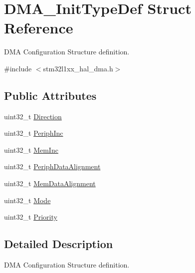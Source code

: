 \hypertarget{struct_d_m_a___init_type_def}{\section{D\-M\-A\-\_\-\-Init\-Type\-Def Struct Reference}
\label{struct_d_m_a___init_type_def}
}


D\-M\-A Configuration Structure definition.  




{\ttfamily \#include $<$stm32l1xx\-\_\-hal\-\_\-dma.\-h$>$}

\subsection*{Public Attributes}
\begin{DoxyCompactItemize}
\item 
uint32\-\_\-t \hyperlink{struct_d_m_a___init_type_def_a0145b5d0e074fa8e2e185ecf2c4a15ca}{Direction}
\item 
uint32\-\_\-t \hyperlink{struct_d_m_a___init_type_def_a46811eb656170cb5c542054d1a41db3a}{Periph\-Inc}
\item 
uint32\-\_\-t \hyperlink{struct_d_m_a___init_type_def_a49b187ba5ab8ba4354e02837e8b99414}{Mem\-Inc}
\item 
uint32\-\_\-t \hyperlink{struct_d_m_a___init_type_def_a10a4a549953efa20c235dcbb381b6f0b}{Periph\-Data\-Alignment}
\item 
uint32\-\_\-t \hyperlink{struct_d_m_a___init_type_def_a7784efedc4a61325fa7364fcace10136}{Mem\-Data\-Alignment}
\item 
uint32\-\_\-t \hyperlink{struct_d_m_a___init_type_def_adbbca090b53d32ac93cc7359b7994db2}{Mode}
\item 
uint32\-\_\-t \hyperlink{struct_d_m_a___init_type_def_af110cc02c840207930e3c0e5de5d7dc4}{Priority}
\end{DoxyCompactItemize}


\subsection{Detailed Description}
D\-M\-A Configuration Structure definition. 

